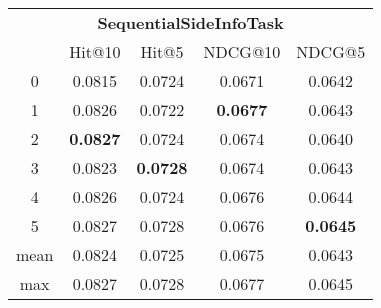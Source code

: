 \documentclass{article}
\begin{document}
 

\begin{tabular}{c|cccc}

\multicolumn{5}{c}{\textbf{SequentialSideInfoTask}} \\
\noalign{\smallskip}
\noalign{\smallskip}
\toprule
\multicolumn{1}{c}{Template ID} & \multicolumn{1}{|c}{Hit@10} & \multicolumn{1}{c}{Hit@5} & \multicolumn{1}{c}{NDCG@10} & \multicolumn{1}{c}{NDCG@5} \\
\midrule
0 & 0.0815 & 0.0724 & 0.0671 & 0.0642 \\
1 & 0.0826 & 0.0722 & \textbf{0.0677} & 0.0643 \\
2 & \textbf{0.0827} & 0.0724 & 0.0674 & 0.0640 \\
3 & 0.0823 & \textbf{0.0728} & 0.0674 & 0.0643 \\
4 & 0.0826 & 0.0724 & 0.0676 & 0.0644 \\
5 & 0.0827 & 0.0728 & 0.0676 & \textbf{0.0645} \\
\midrule
mean & 0.0824 & 0.0725 & 0.0675 & 0.0643 \\
max & 0.0827 & 0.0728 & 0.0677 & 0.0645 \\
\bottomrule

\end{tabular}
\end{document}

